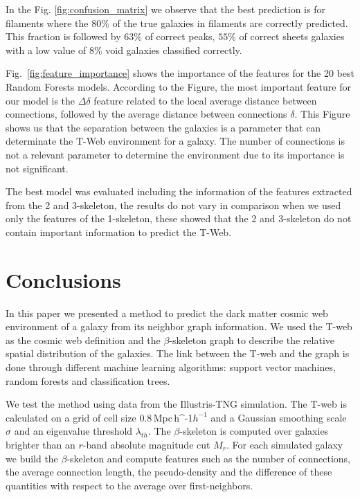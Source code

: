 \documentclass[usenatbib]{mnras}
\newcommand{\Mpch}{\,{\rm Mpc}\,\ifmmode h^{-1}\else $h^{-1}$\fi}
\begin{document}
In the Fig. \ref{fig:confusion_matrix} we observe that the best prediction is for filaments where the $80\%$ of the true galaxies in filaments are correctly predicted. 
This fraction is followed by $63\%$ of correct peaks, $55\%$ of correct   sheets galaxies with a low value of $8\%$ void galaxies classified correctly.

Fig.~\ref{fig:feature_importance} shows the importance of the features for the 20 best Random Forests models. According to the Figure, the most important feature for our model is the $\Delta \delta$ feature related to the local average distance between connections, followed by the average distance between connections $\delta$. This Figure shows us that the separation between the galaxies is a parameter that can determinate the T-Web environment for a galaxy. The number of connections is not a relevant parameter to determine the environment due to its importance is not significant.

The best model was evaluated including the information of the features extracted from the 2 and 3-skeleton, the results do not vary in comparison when we used only the features of the 1-skeleton, these showed that the 2 and 3-skeleton do not contain important information to predict the T-Web.


\section{Conclusions}\label{sec:conclusions}

In this paper we presented a method to predict the dark matter cosmic web
environment of a galaxy from its neighbor graph information.
We used the T-web as the cosmic web definition \citep{Forero-Romero2009}
and the $\beta$-skeleton graph \citep{Fang2019} 
to describe the relative spatial distribution of the galaxies. 
The link between the T-web and the graph is done through different
machine learning algorithms: support vector machines, random forests and
classification trees.

We test the method using data from the Illustris-TNG simulation.
The T-web is calculated on a grid of cell size $0.8$\Mpch 
and a Gaussian smoothing scale $\sigma$ and an eigenvalue threshold $\lambda_{th}$.
The $\beta$-skeleton is computed over galaxies brighter than 
an $r$-band absolute magnitude cut $M_{r}$.
For each simulated galaxy we build the $\beta$-skeleton and
compute features such as the number of connections, the average connection
length, the pseudo-density and the difference of these quantities with
respect to the average over first-neighbors.
\end{document}
